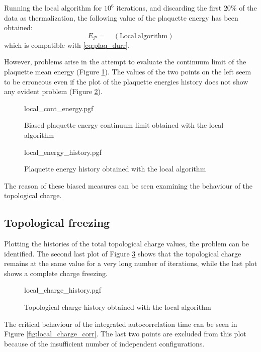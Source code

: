 Running the local algorithm for $10^6$ iterations, and discarding the first $20\%$ of the data as thermalization,
the following value of the plaquette energy has been obtained:
\begin{equation}\label{eq:plaq_local}
    E_{\mathcal P} =  \quad \mathrm{(Local\ algorithm)}
\end{equation}
which is compatible with \eqref{eq:plaq_durr}.

However, problems arise in the attempt to evaluate the continuum limit of the plaquette mean energy (Figure \ref{fig:local_cont_energy}).
The values of the two points on the left seem to be erroneous even if the plot of the plaquette energies history
does not show any evident problem (Figure \ref{fig:local_energy_history}).

\begin{figure}[!htb]
    \centering
    {local_cont_energy.pgf}
    \caption{Biased plaquette energy continuum limit obtained with the local algorithm}
    \label{fig:local_cont_energy}
\end{figure}

\begin{figure}[!htb]
    \centering
    {local_energy_history.pgf}
    \caption{Plaquette energy history obtained with the local algorithm}
    \label{fig:local_energy_history}
\end{figure}

The reason of these biased measures can be seen examining the behaviour of the topological charge.

\subsection*{Topological freezing}

Plotting the histories of the total topological charge values, the problem can be identified.
The second last plot of Figure \ref{fig:local_charge_history} shows that the topological charge remains at the same value for a very long number of iterations,
while the last plot shows a complete charge freezing.

\begin{figure}[!htb]
    \centering
    {local_charge_history.pgf}
    \caption{Topological charge history obtained with the local algorithm}
    \label{fig:local_charge_history}
\end{figure}

The critical behaviour of the integrated autocorrelation time can be seen in Figure \ref{fig:local_charge_corr}.
The last two points are excluded from this plot because of the insufficient number of independent configurations.


